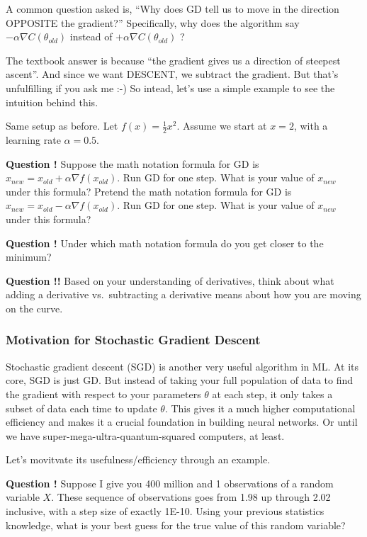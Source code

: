 \documentclass[
]{article}
\begin{document}
A common question asked is, ``Why does GD tell us to move in the
direction OPPOSITE the gradient?'' Specifically, why does the algorithm
say \(- \alpha \nabla C(\theta_{old})\) instead of
\(+\alpha \nabla C(\theta_{old})\) ?

The textbook answer is because ``the gradient gives us a direction of
steepest ascent''. And since we want DESCENT, we subtract the gradient.
But that's unfulfilling if you ask me :-) So intead, let's use a simple
example to see the intuition behind this.

Same setup as before. Let \(f(x) = \frac{1}{2}x^2\). Assume we start at
\(x = 2\), with a learning rate \(\alpha = 0.5\).

\textbf{Question !} Suppose the math notation formula for GD is
\(x_{new} = x_{old} + \alpha \nabla f(x_{old})\). Run GD for one step.
What is your value of \(x_{new}\) under this formula? Pretend the math
notation formula for GD is
\(x_{new} = x_{old} - \alpha \nabla f(x_{old})\). Run GD for one step.
What is your value of \(x_{new}\) under this formula?

\textbf{Question !} Under which math notation formula do you get closer
to the minimum?

\textbf{Question !!} Based on your understanding of derivatives, think
about what adding a derivative vs.~subtracting a derivative means about
how you are moving on the curve.

\hypertarget{motivation-for-stochastic-gradient-descent}{%
\subsubsection{Motivation for Stochastic Gradient
Descent}\label{motivation-for-stochastic-gradient-descent}}

Stochastic gradient descent (SGD) is another very useful algorithm in
ML. At its core, SGD is just GD. But instead of taking your full
population of data to find the gradient with respect to your parameters
\(\theta\) at each step, it only takes a subset of data each time to
update \(\theta\). This gives it a much higher computational efficiency
and makes it a crucial foundation in building neural networks. Or until
we have super-mega-ultra-quantum-squared computers, at least.

Let's movitvate its usefulness/efficiency through an example.

\textbf{Question !} Suppose I give you 400 million and 1 observations of
a random variable \(X\). These sequence of observations goes from 1.98
up through 2.02 inclusive, with a step size of exactly 1E-10. Using your
previous statistics knowledge, what is your best guess for the true
value of this random variable?
\end{document}

